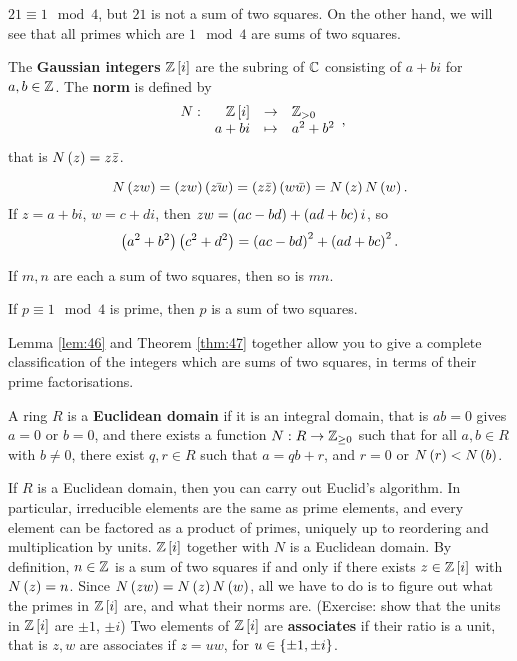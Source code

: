 \begin{example2}
$ 21 \equiv 1 \mod 4 $, but $ 21 $ is not a sum of two squares. On the other hand, we will see that all primes which are $ 1 \mod 4 $ are sums of two squares.
\end{example2}

\begin{definition}
The \textbf{Gaussian integers} $ \mathbb{Z}\left[ i \right] $ are the subring of $ \mathbb{C} $ consisting of $ a + bi $ for $ a, b \in \mathbb{Z} $. The \textbf{norm} is defined by
$$ \function[N]{\Z\sb{i}}{\Z_{> 0}}{a + bi}{a^2 + b^2}, $$
that is $ N\left( z \right) = z\bar{z} $.
\end{definition}

$$ N\left( zw \right) = \left( zw \right)\left( \bar{zw} \right) = \left( z\bar{z} \right)\left( w\bar{w} \right) = N\left( z \right)N\left( w \right). $$
If $ z = a + bi $, $ w = c + di $, then $ zw = \left( ac - bd \right) + \left( ad + bc \right)i $, so
$$ \left( a^2 + b^2 \right)\left( c^2 + d^2 \right) = \left( ac - bd \right)^2 + \left( ad + bc \right)^2. $$

\begin{lemma}
\label{lem:46}
If $ m, n $ are each a sum of two squares, then so is $ mn $.
\end{lemma}

\begin{theorem}
\label{thm:47}
If $ p \equiv 1 \mod 4 $ is prime, then $ p $ is a sum of two squares.
\end{theorem}

Lemma \ref{lem:46} and Theorem \ref{thm:47} together allow you to give a complete classification of the integers which are sums of two squares, in terms of their prime factorisations.

\begin{definition}
A ring $ R $ is a \textbf{Euclidean domain} if it is an integral domain, that is $ ab = 0 $ gives $ a = 0 $ or $ b = 0 $, and there exists a function $ N : R \to \mathbb{Z}_{\ge 0} $ such that for all $ a, b \in R $ with $ b \ne 0 $, there exist $ q, r \in R $ such that $ a = qb + r $, and $ r = 0 $ or $ N\left( r \right) < N\left( b \right) $.
\end{definition}

If $ R $ is a Euclidean domain, then you can carry out Euclid's algorithm. In particular, irreducible elements are the same as prime elements, and every element can be factored as a product of primes, uniquely up to reordering and multiplication by units. $ \mathbb{Z}\left[ i \right] $ together with $ N $ is a Euclidean domain. By definition, $ n \in \mathbb{Z} $ is a sum of two squares if and only if there exists $ z \in \mathbb{Z}\left[ i \right] $ with $ N\left( z \right) = n $. Since $ N\left( zw \right) = N\left( z \right)N\left( w \right) $, all we have to do is to figure out what the primes in $ \mathbb{Z}\left[ i \right] $ are, and what their norms are. (Exercise: show that the units in $ \mathbb{Z}\left[ i \right] $ are $ \pm 1 $, $ \pm i $) Two elements of $ \mathbb{Z}\left[ i \right] $ are \textbf{associates} if their ratio is a unit, that is $ z, w $ are associates if $ z = uw $, for $ u \in \left\{ \pm 1, \pm i \right\} $.

